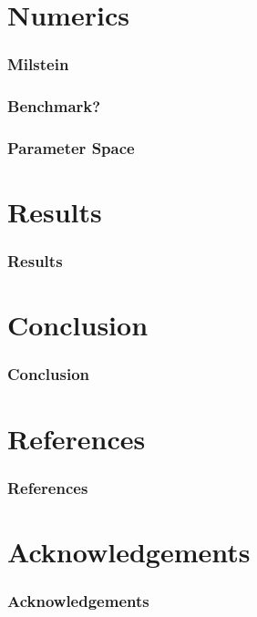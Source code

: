 \documentclass{beamer}   %
\begin{document}
\section{Numerics}

\begin{frame}
    \frametitle{Milstein}
\end{frame}

\begin{frame}
    \frametitle{Benchmark?}
\end{frame}

\begin{frame}
    \frametitle{Parameter Space}
\end{frame}





\section{Results}

\begin{frame}
    \frametitle{Results}
\end{frame}






\section{Conclusion}

\begin{frame}
    \frametitle{Conclusion}
\end{frame}





\section{References}

\begin{frame}
    \frametitle{References}
\end{frame}






\section{Acknowledgements}

\begin{frame}
    \frametitle{Acknowledgements}
\end{frame}
\end{document}
